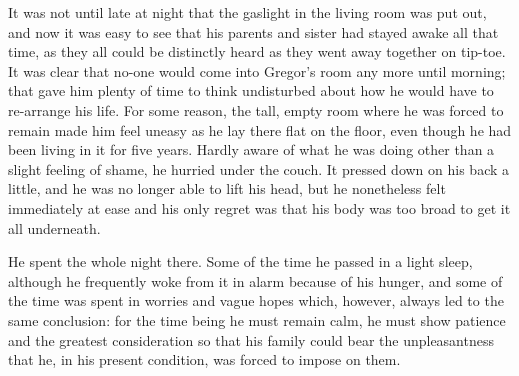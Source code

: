 It was not until late at night that the gaslight in the living room was
put out, and now it was easy to see that his parents and sister had
stayed awake all that time, as they all could be distinctly heard as
they went away together on tip-toe. It was clear that no-one would come
into Gregor’s room any more until morning; that gave him plenty of time
to think undisturbed about how he would have to re-arrange his life.
For some reason, the tall, empty room where he was forced to remain
made him feel uneasy as he lay there flat on the floor, even though he
had been living in it for five years. Hardly aware of what he was doing
other than a slight feeling of shame, he hurried under the couch. It
pressed down on his back a little, and he was no longer able to lift
his head, but he nonetheless felt immediately at ease and his only
regret was that his body was too broad to get it all underneath.

He spent the whole night there. Some of the time he passed in a light
sleep, although he frequently woke from it in alarm because of his
hunger, and some of the time was spent in worries and vague hopes
which, however, always led to the same conclusion: for the time being
he must remain calm, he must show patience and the greatest
consideration so that his family could bear the unpleasantness that he,
in his present condition, was forced to impose on them.

